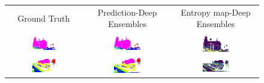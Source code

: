     \begin{figure}[h!]
        \begin{tabular}{ccc}
            Ground Truth & Prediction-Deep Ensembles & Entropy map-Deep Ensembles \\
            \includegraphics[width=0.33\textwidth, height=0.18\textheight]{images/seg_output/sem3d_seg_output/1_GT.pdf} &
            \includegraphics[width=0.33\textwidth, height=0.18\textheight]{images/seg_output/sem3d_seg_output/1_Pred.pdf}& 
            \includegraphics[width=0.33\textwidth, height=0.18\textheight]{images/seg_output/sem3d_seg_output/ent_de_1.pdf}\\

            \includegraphics[width=0.33\textwidth, height=0.18\textheight]{images/seg_output/sem3d_seg_output/2_GT.pdf} &
            \includegraphics[width=0.33\textwidth, height=0.18\textheight]{images/seg_output/sem3d_seg_output/2_Pred.pdf}& 
            \includegraphics[width=0.33\textwidth, height=0.18\textheight]{images/seg_output/sem3d_seg_output/ent_de_2.pdf}\\


\end{tabular}
\end{figure}
